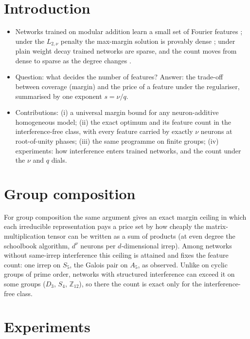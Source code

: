 \documentclass{article} %
\theoremstyle{plain}
\theoremstyle{definition}
\theoremstyle{remark}
\begin{document}
\section{Introduction}
\label{sec:intro}
\begin{itemize}
  \item Networks trained on modular addition learn a small set of Fourier features \citep{nanda2023progress,chughtai2023toy}; under the $L_{2,\nu}$ penalty the max-margin solution is provably dense \citep{morwani2024feature}; under plain weight decay trained networks are sparse, and the count moves from dense to sparse as the degree changes \citep{mccracken2025}.
  \item Question: what decides the number of features? Answer: the trade-off between coverage (margin) and the price of a feature under the regulariser, summarised by one exponent $s=\nu/q$.
  \item Contributions: (i) a universal margin bound for any neuron-additive homogeneous model; (ii) the exact optimum and its feature count in the interference-free class, with every feature carried by exactly $\nu$ neurons at root-of-unity phases; (iii) the same programme on finite groups; (iv) experiments: how interference enters trained networks, and the count under the $\nu$ and $q$ dials.
\end{itemize}



\section{Group composition}
\label{sec:groups}
For group composition the same argument gives an exact margin ceiling in which each irreducible representation pays a price set by how cheaply the matrix-multiplication tensor can be written as a sum of products (at even degree the schoolbook algorithm, $d^\nu$ neurons per $d$-dimensional irrep). Among networks without same-irrep interference this ceiling is attained and fixes the feature count: one irrep on $S_5$, the Galois pair on $A_5$, as observed. Unlike on cyclic groups of prime order, networks with structured interference can exceed it on some groups ($D_3$, $S_4$, $\mathbb{Z}_{12}$), so there the count is exact only for the interference-free class.

\section{Experiments}
\label{sec:experiments}
\end{document}
